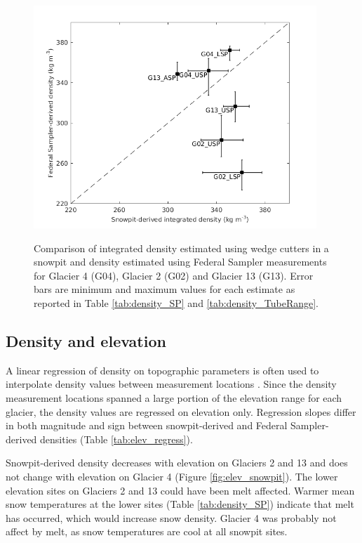 \documentclass{sfuthesis}
\begin{document}
\begin{figure}[H]
	\centering
	\includegraphics[width =0.95\textwidth]{SnowpitVsSWEtube_all.png}\\
	\caption{Comparison of integrated density estimated using wedge cutters in a snowpit and density estimated using Federal Sampler measurements for Glacier 4 (G04), Glacier 2 (G02) and Glacier 13 (G13). Error bars are minimum and maximum values for each estimate as reported in Table \ref{tab:density_SP} and \ref{tab:density_TubeRange}. }
	\label{fig:density_pitVStube}
\end{figure}


\subsection{Density and elevation}

A linear regression of density on topographic parameters is often used to interpolate density values between measurement locations \citep[e.g.][]{Elder1998, Molotch2005,Wetlaufer2016}. Since the density measurement locations spanned a large portion of the elevation range for each glacier, the density values are regressed on elevation only. Regression slopes differ in both magnitude and sign between snowpit-derived and Federal Sampler-derived densities (Table \ref{tab:elev_regress}). 

Snowpit-derived density decreases with elevation on Glaciers 2 and 13 and does not change with elevation on Glacier 4 (Figure \ref{fig:elev_snowpit}). The lower elevation sites on Glaciers 2 and 13 could have been melt affected. Warmer mean snow temperatures at the lower sites (Table \ref{tab:density_SP}) indicate that melt has occurred, which would increase snow density. Glacier 4 was probably not affect by melt, as snow temperatures are cool at all snowpit sites. 
\end{document}
